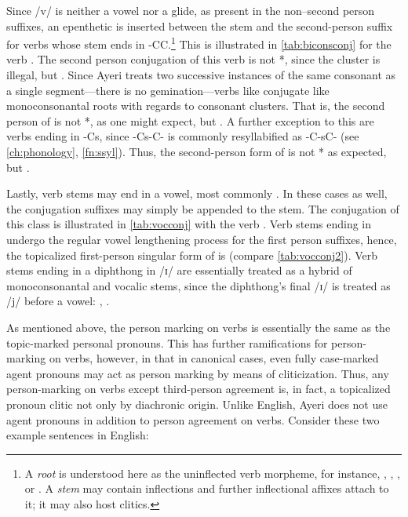 Since /v/ is neither a vowel nor a glide, as present in the non--second person
suffixes, an epenthetic  is inserted between the stem and the
second-person suffix for verbs whose stem ends in -CC.\footnote{A \emph{root}
is understood here as the uninflected verb morpheme, for instance,
, , , or .
A \emph{stem} may contain inflections and further inflectional affixes attach
to it; it may also host clitics.} This is illustrated in
\autoref{tab:biconsconj} for the verb . The second
person conjugation of this verb is not *, since the
cluster  is illegal, but . Since Ayeri treats
two successive instances of the same consonant as a single segment---there is
no gemination---verbs like  conjugate like
monoconsonantal roots with regards to consonant clusters. That is, the second
person of  is not *, as one might
expect, but . A further exception to this are verbs
ending in -Cs, since -Cs-C- is commonly resyllabified as -C-sC- (see
\autoref{ch:phonology}, \autoref{fn:ssyl}). Thus, the second-person form of
 is not * as expected, but
.

Lastly, verb stems may end in a vowel, most commonly . In these cases
as well, the conjugation suffixes may simply be appended to the stem. The
conjugation of this class is illustrated in \autoref{tab:vocconj} with the
verb . Verb stems ending in  undergo the regular
vowel lengthening process for the first person suffixes, hence, the
topicalized first-person singular form of  is
 (compare \autoref{tab:vocconj2}). Verb stems
ending in a diphthong in /ɪ/ are essentially treated as a hybrid of
monoconsonantal and vocalic stems, since the diphthong's final /ɪ/ is treated
as /j/ before a vowel: ,
.

As mentioned above, the person marking on verbs is essentially the same as the
topic-marked personal pronouns. This has further ramifications for
person-marking on verbs, however, in that in canonical cases, even fully
case-marked agent pronouns may act as person marking by means of cliticization.
Thus, any person-marking on verbs except third-person agreement is, in fact, a
topicalized pronoun clitic not only by diachronic origin. Unlike English, Ayeri
does not use agent pronouns in addition to person agreement on verbs. Consider
these two example sentences in English:

